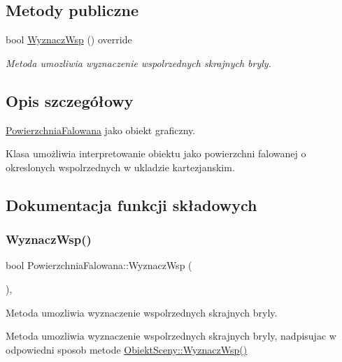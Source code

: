 \subsection*{Metody publiczne}
\begin{DoxyCompactItemize}
\item 
bool \hyperlink{classPowierzchniaFalowana_ae9f43f9acfb3db49fc9931ca4917e049}{Wyznacz\+Wsp} () override
\begin{DoxyCompactList}\small\item\em Metoda umozliwia wyznaczenie wspolrzednych skrajnych bryly. \end{DoxyCompactList}\end{DoxyCompactItemize}


\subsection{Opis szczegółowy}
\hyperlink{classPowierzchniaFalowana}{Powierzchnia\+Falowana} jako obiekt graficzny. 

Klasa umożliwia interpretowanie obiektu jako powierzchni falowanej o okreslonych wspolrzednych w ukladzie kartezjanskim. 

\subsection{Dokumentacja funkcji składowych}
\mbox{\label{classPowierzchniaFalowana_ae9f43f9acfb3db49fc9931ca4917e049}} 
\subsubsection{\texorpdfstring{Wyznacz\+Wsp()}{WyznaczWsp()}}
{\footnotesize\ttfamily bool Powierzchnia\+Falowana\+::\+Wyznacz\+Wsp (\begin{DoxyParamCaption}{ }\end{DoxyParamCaption})\hspace{0.3cm}{\ttfamily [override]}, {\ttfamily [virtual]}}



Metoda umozliwia wyznaczenie wspolrzednych skrajnych bryly. 

Metoda umozliwia wyznaczenie wspolrzednych skrajnych bryly, nadpisujac w odpowiedni sposob metode \hyperlink{classObiektSceny_a24dd0332c0755d7155128639a9a3e2b4}{Obiekt\+Sceny\+::\+Wyznacz\+Wsp()}

